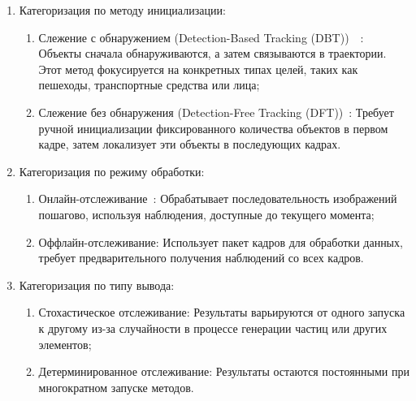\begin{enumerate}

	\item Категоризация по методу инициализации: 
		
	\begin{enumerate}
		
		\item Слежение с обнаружением (Detection-Based Tracking (DBT))~\cite{Bose2007}~\cite{Song2010}: Объекты сначала обнаруживаются, а затем связываются в траектории. Этот метод фокусируется на конкретных типах целей, таких как пешеходы, транспортные средства или лица;
		
		\item Слежение без обнаружения (Detection-Free Tracking (DFT))~\cite{Zhang2013}: Требует ручной инициализации фиксированного количества объектов в первом кадре, затем локализует эти объекты в последующих кадрах.
	
	\end{enumerate}
	
	\item Категоризация по режиму обработки:
	
	\begin{enumerate}
		
		\item Онлайн-отслеживание~\cite{Xiang2015}: Обрабатывает последовательность изображений пошагово, используя наблюдения, доступные до текущего момента;
		
		\item Оффлайн-отслеживание: Использует пакет кадров для обработки данных, требует предварительного получения наблюдений со всех кадров.
		
	\end{enumerate}
	
	\item Категоризация по типу вывода:
	
	\begin{enumerate}
		
		\item Стохастическое отслеживание: Результаты варьируются от одного запуска к другому из-за случайности в процессе генерации частиц или других элементов;
		
		\item Детерминированное отслеживание: Результаты остаются постоянными при многократном запуске методов.
		
	\end{enumerate}
	
\end{enumerate}

